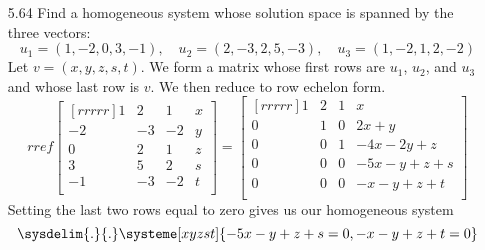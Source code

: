 \documentclass[12pt]{article}
\begin{document}
\begin{enumerate}
\item[5.64] Find a homogeneous system whose solution space is spanned by the three vectors: \[ u_1=(1,-2,0,3,-1), \quad u_2=(2,-3,2,5,-3), \quad u_3=(1,-2,1,2,-2) \]
	Let $v=(x,y,z,s,t)$. We form a matrix whose first rows are $u_1$, $u_2$, and $u_3$ and whose last row is $v$. We then reduce to row echelon form.
	\[ rref\begin{bmatrix}[rrrrr]1&2&1&x\\-2&-3&-2&y\\0&2&1&z\\3&5&2&s\\-1&-3&-2&t\\\end{bmatrix}=\begin{bmatrix}[rrrrr]1&2&1&x\\0&1&0&2x+y\\0&0&1&-4x-2y+z\\0&0&0&-5x-y+z+s\\0&0&0&-x-y+z+t\\\end{bmatrix} \]
	Setting the last two rows equal to zero gives us our homogeneous system
	\[ \sysdelim{.}{.}\systeme[xyzst]{-5x-y+z+s=0,-x-y+z+t=0} \]




\end{enumerate}
\end{document}
